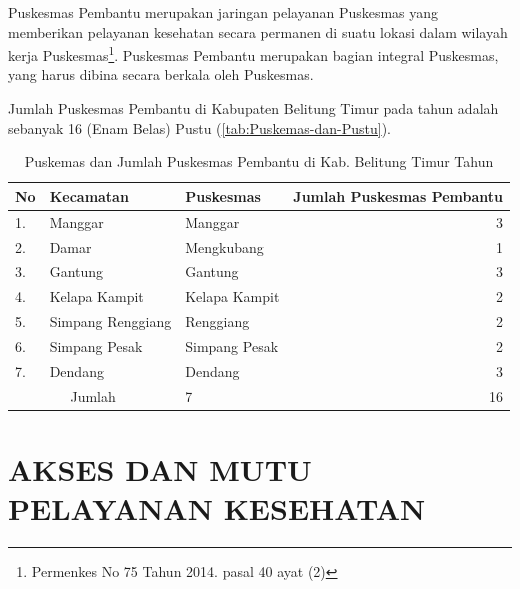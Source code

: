 Puskesmas Pembantu merupakan jaringan pelayanan Puskesmas yang memberikan pelayanan kesehatan secara permanen di suatu lokasi dalam wilayah kerja Puskesmas\footnote{Permenkes No 75 Tahun 2014. pasal 40 ayat (2)}. Puskesmas  Pembantu merupakan bagian integral  Puskesmas, yang harus dibina secara berkala oleh Puskesmas.

Jumlah Puskesmas Pembantu di Kabupaten Belitung Timur pada tahun \tP adalah sebanyak 16 (Enam Belas) Pustu (\autoref{tab:Puskemas-dan-Pustu}).

\begin{table}[!ht]
\caption{Puskemas dan Jumlah Puskesmas Pembantu di Kab. Belitung Timur Tahun \tP}
\label{tab:Puskemas-dan-Pustu}
\centering{}%

\begin{tabular}{lllr}
	\toprule
    No & Kecamatan & Puskesmas & Jumlah Puskesmas Pembantu\\
    \midrule
	1.                    & Manggar           & Manggar       & 3 \\
	\rowcolor{black!10}2. & Damar             & Mengkubang    & 1 \\
	3.                    & Gantung           & Gantung       & 3 \\
	\rowcolor{black!10}4. & Kelapa Kampit     & Kelapa Kampit & 2 \\
	5.                    & Simpang Renggiang & Renggiang     & 2 \\
	\rowcolor{black!10}6. & Simpang Pesak     & Simpang Pesak & 2 \\
	7.                    & Dendang           & Dendang       & 3 \\
    \midrule
    \multicolumn{2}{c}{Jumlah}                & 7             & 16\\
    \bottomrule
\end{tabular}
\end{table}

\section{AKSES DAN MUTU PELAYANAN KESEHATAN}
